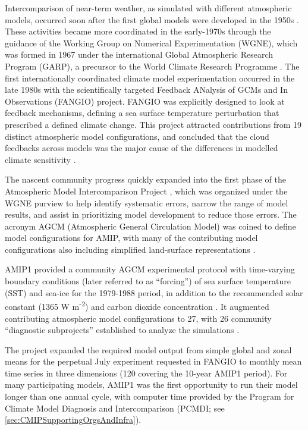 \documentclass[manuscript]{copernicus}
\begin{document}
Intercomparison of near-term weather, as simulated with different atmospheric models, occurred soon after the first global models were developed in the 1950s \citep[e.g.,][]{gates_ams_1992,edwards_history_2011}. These activities became more coordinated in the early-1970s through the guidance of the Working Group on Numerical Experimentation (WGNE), which was formed in 1967 under the international Global Atmospheric Research Program (GARP), a precursor to the World Climate Research Programme \citep[WCRP;][]{gates_ams_1992}. The first internationally coordinated climate model experimentation occurred in the late 1980s with the scientifically targeted Feedback ANalysis of GCMs and In Observations (FANGIO) project. FANGIO was explicitly designed to look at feedback mechanisms, defining a sea surface temperature perturbation that prescribed a defined climate change. This project attracted contributions from 19 distinct atmospheric model configurations, and concluded that the cloud feedbacks across models was the major cause of the differences in modelled climate sensitivity \citep{cess_methodology_1988, cess_interpretation_1989, cess_intercomparison_1990, cess_first_1991}.

The nascent community progress quickly expanded into the first phase of the Atmospheric Model Intercomparison Project \citep[AMIP, hereafter referred to as AMIP1;][]{gates_amip_1992}, which was organized under the WGNE purview to help identify systematic errors, narrow the range of model results, and assist in prioritizing model development to reduce those errors. The acronym AGCM (Atmospheric General Circulation Model) was coined to define model configurations for AMIP, with many of the contributing model configurations also including simplified land-surface representations \citep[e.g.,][]{budyko_heat_1961,manabe_climate_1969,vargas_godoy_global_2021}.

AMIP1 provided a community AGCM experimental protocol with time-varying boundary conditions (later referred to as ``forcing'') of sea surface temperature (SST) and sea-ice for the 1979-1988 period, in addition to the recommended solar constant (1365 W m\textsuperscript{-2}) and carbon dioxide concentration \citep[345 ppm;][]{gates_amip_1991}. It augmented contributing atmospheric model configurations to 27, with 26 community ``diagnostic subprojects'' established to analyze the simulations \citep{gates_amip_1995}.

The project expanded the required model output from simple global and zonal means for the perpetual July experiment requested in FANGIO to monthly mean time series in three dimensions (120 covering the 10-year AMIP1 period). For many participating models, AMIP1 was the first opportunity to run their model longer than one annual cycle, with computer time provided by the Program for Climate Model Diagnosis and Intercomparison (PCMDI; see \autoref{sec:CMIPSupportingOrgsAndInfra}).
\end{document}
